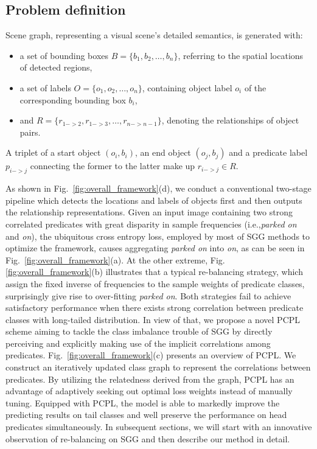 \documentclass[sigconf]{acmart}
\begin{document}
\subsection{Problem definition}
Scene graph\cite{scene_graph}, representing a visual scene's detailed semantics, is generated with:
\begin{itemize}
    \item a set of bounding boxes $B = \{{b}_{1}, {b}_{2}, …, {b}_{n}\}$, referring to the spatial locations of detected regions,
    \item a set of labels $O = \{{o}_{1}, {o}_{2}, …, {o}_{n}\}$, containing object label ${o}_{i}$ of the corresponding bounding box ${b}_{i}$,
    \item and $R = \{{r}_{1->2}, {r}_{1->3}, …, {r}_{n->n-1}\}$, denoting the relationships of object pairs.
\end{itemize}
A triplet of a start object $({o}_{i}, {b}_{i})$, an end object $({o}_{j}, {b}_{j})$ and a predicate label ${p}_{i->j}$ connecting the former to the latter make up ${r}_{i->j} \in R$.

 As shown in Fig.~\ref{fig:overall_framework}(d), we conduct a conventional two-stage pipeline which detects the locations and labels of objects first and then outputs the relationship representations. Given an input image containing two strong correlated predicates with great disparity in sample frequencies (i.e.,\emph{parked on} and \emph{on}), the ubiquitous cross entropy loss, employed by most of SGG methods to optimize the framework, causes aggregating \emph{parked on} into \emph{on}, as can be seen in Fig.~\ref{fig:overall_framework}(a). At the other extreme, Fig.~ \ref{fig:overall_framework}(b) illustrates that a typical re-balancing strategy, which assign the 
fixed inverse of frequencies to the sample weights of predicate classes, surprisingly give rise to over-fitting \emph{parked on}. Both strategies fail to achieve satisfactory performance when there exists strong correlation between predicate classes with long-tailed distribution. In view of that, we propose a novel PCPL scheme aiming to tackle the class imbalance trouble of SGG by directly perceiving and explicitly making use of the implicit correlations among predicates. Fig.~\ref{fig:overall_framework}(c) presents an overview of PCPL. We construct an iteratively updated class graph to represent the correlations between predicates. By utilizing the relatedness derived from the graph, PCPL has an 
advantage of adaptively seeking out optimal loss weights instead of manually tuning. Equipped with PCPL, the model is able to markedly improve the predicting results on tail classes and well preserve the performance on head predicates simultaneously. In subsequent sections, we will start with an innovative observation of re-balancing on SGG and then describe our method in detail.
\end{document}
